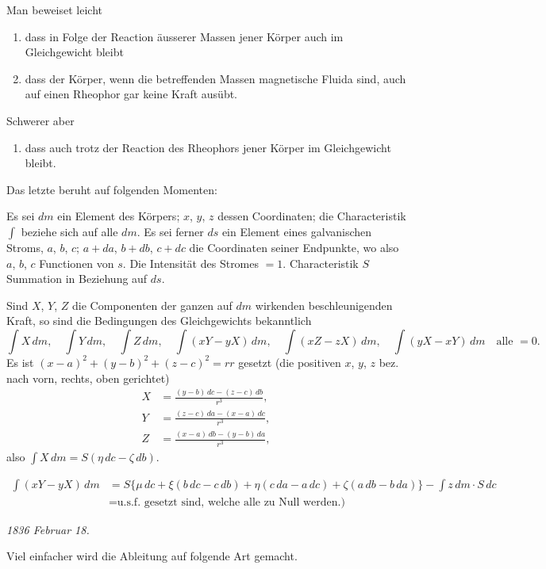 \documentclass[fontsize=10pt,paper=a5,pagesize=auto]{scrbook}
\newcommand{\origpage}[1]{\marginpar{\footnotesize\textit{S. #1}}}
\begin{document}
Man beweiset leicht
\begin{enumerate}[label=\arabic*.]
\item dass in Folge der Reaction äusserer Massen jener Körper auch im Gleichgewicht bleibt
\item dass der Körper, wenn die betreffenden Massen magnetische Fluida sind, auch auf einen Rheophor gar keine Kraft ausübt.
\end{enumerate}

Schwerer aber
\begin{enumerate}[label=\arabic*.,start=3]
\item dass auch trotz der Reaction des Rheophors jener Körper im Gleichgewicht bleibt.
\end{enumerate}

Das letzte beruht auf folgenden Momenten:

Es sei $dm$ ein Element des Körpers; $x$, $y$, $z$ dessen Coordinaten; die Characteristik $\int$ beziehe sich auf alle $dm$. Es sei ferner $ds$ ein Element eines galvanischen Stroms, $a$, $b$, $c$; $a + da$, $b + db$, $c + dc$ die Coordinaten seiner Endpunkte, wo also $a$, $b$, $c$ Functionen von $s$. Die Intensität des Stromes $= 1$. Characteristik $S$ Summation in Beziehung auf $ds$.

Sind $X$, $Y$, $Z$ die Componenten der ganzen auf $dm$ wirkenden beschleunigenden Kraft, so sind die Bedingungen des Gleichgewichts bekanntlich
\[
\int X \, dm, \quad \int Y \, dm, \quad \int Z \, dm, \quad \int (xY - yX) \, dm, \quad \int (xZ - zX) \, dm, \quad \int (yX - xY) \, dm \quad \text{alle } = 0.
\]
Es ist $(x - a)^2 + (y - b)^2 + (z - c)^2 = rr$ gesetzt (die positiven $x$, $y$, $z$ bez. nach vorn, rechts, oben gerichtet)
\begin{align*}
X &= \frac{(y - b) \, dc - (z - c) \, db}{r^3},\\
Y &= \frac{(z - c) \, da - (x - a) \, dc}{r^3},\\
Z &= \frac{(x - a) \, db - (y - b) \, da}{r^3},
\end{align*}
also $\int X \, dm = S(\eta \, dc - \zeta \, db)$.

\origpage{628}
\begin{align*}
\int (xY - yX) \, dm &= S\{\mu \, dc + \xi(b \, dc - c \, db) + \eta(c \, da - a \, dc) + \zeta(a \, db - b \, da)\} - \int z \, dm \cdot S \, dc\\
&= \text{u.s.f. gesetzt sind, welche alle zu Null werden.)}
\end{align*}

\begin{otherlanguage}{ngerman}
\textit{1836 Februar 18.}

Viel einfacher wird die Ableitung auf folgende Art gemacht.
\end{otherlanguage}
\end{document}
